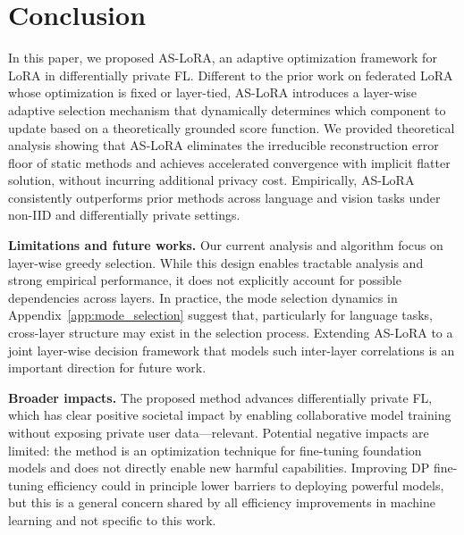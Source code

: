\vspace{-3mm}

\section{Conclusion} \label{sec:conclusion}

In this paper, we proposed AS-LoRA, an adaptive optimization framework for LoRA in differentially private FL. 
Different to the prior work on federated LoRA whose optimization is fixed or layer-tied, AS-LoRA introduces a layer-wise adaptive selection mechanism that dynamically determines which component to update based on a theoretically grounded score function. 
We provided theoretical analysis showing that AS-LoRA eliminates the irreducible reconstruction error floor of static methods and achieves accelerated convergence with implicit flatter solution, without incurring additional privacy cost. Empirically, AS-LoRA consistently outperforms prior methods across language and vision tasks under non-IID and differentially private settings.

\textbf{Limitations and future works.}
Our current analysis and algorithm focus on layer-wise greedy selection. While this design enables tractable analysis and strong empirical performance, it does not explicitly account for possible dependencies across layers. In practice, the mode selection dynamics in Appendix~\ref{app:mode_selection} suggest that, particularly for language tasks, cross-layer structure may exist in the selection process. Extending AS-LoRA to a joint layer-wise decision framework that models such inter-layer correlations is an important direction for future work.

\textbf{Broader impacts.}
The proposed method advances differentially private FL, which has clear positive societal impact by enabling collaborative model training without exposing private user data—relevant. Potential negative impacts are limited: the method is an optimization technique for fine-tuning foundation models and does not directly enable new harmful capabilities. Improving DP fine-tuning efficiency could in principle lower barriers to deploying powerful models, but this is a general concern shared by all efficiency improvements in machine learning and not specific to this work.